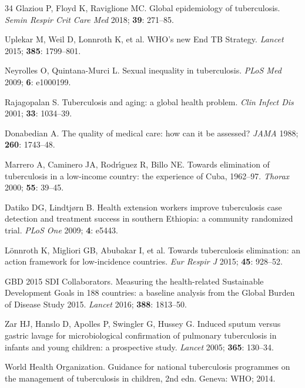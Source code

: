 \documentclass[12pt]{article}
\begin{document}
\begin{thebibliography}{34}
Glaziou P, Floyd K, Raviglione MC. Global epidemiology of tuberculosis. \textit{Semin Respir Crit Care Med} 2018; \textbf{39}: 271--85.

Uplekar M, Weil D, Lonnroth K, et al. WHO's new End TB Strategy. \textit{Lancet} 2015; \textbf{385}: 1799--801.

Neyrolles O, Quintana-Murci L. Sexual inequality in tuberculosis. \textit{PLoS Med} 2009; \textbf{6}: e1000199.

Rajagopalan S. Tuberculosis and aging: a global health problem. \textit{Clin Infect Dis} 2001; \textbf{33}: 1034--39.

Donabedian A. The quality of medical care: how can it be assessed? \textit{JAMA} 1988; \textbf{260}: 1743--48.

Marrero A, Caminero JA, Rodr{\'\i}guez R, Billo NE. Towards elimination of tuberculosis in a low-income country: the experience of Cuba, 1962--97. \textit{Thorax} 2000; \textbf{55}: 39--45.

Datiko DG, Lindtj{\o}rn B. Health extension workers improve tuberculosis case detection and treatment success in southern Ethiopia: a community randomized trial. \textit{PLoS One} 2009; \textbf{4}: e5443.

L{\"o}nnroth K, Migliori GB, Abubakar I, et al. Towards tuberculosis elimination: an action framework for low-incidence countries. \textit{Eur Respir J} 2015; \textbf{45}: 928--52.

GBD 2015 SDI Collaborators. Measuring the health-related Sustainable Development Goals in 188 countries: a baseline analysis from the Global Burden of Disease Study 2015. \textit{Lancet} 2016; \textbf{388}: 1813--50.

Zar HJ, Hanslo D, Apolles P, Swingler G, Hussey G. Induced sputum versus gastric lavage for microbiological confirmation of pulmonary tuberculosis in infants and young children: a prospective study. \textit{Lancet} 2005; \textbf{365}: 130--34.

World Health Organization. Guidance for national tuberculosis programmes on the management of tuberculosis in children, 2nd edn. Geneva: WHO; 2014.

\end{thebibliography}

\end{document}
